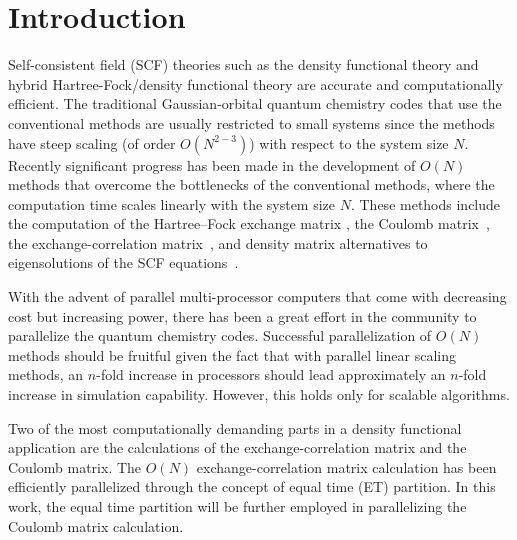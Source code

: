 \commentoutA{\documentclass[prl,aps,twocolumn,twocolumngrid,superbib]{revtex4}}
\begin{document}

\section{Introduction}
\label{sec:intro}
Self-consistent field (SCF) theories such as the density functional
theory and hybrid Hartree-Fock/density functional theory are accurate
and computationally efficient. The traditional Gaussian-orbital
quantum chemistry codes that use the conventional methods\cite{ASzabo}
are usually restricted to small systems since the methods have steep
scaling (of order $O(N^{2-3})$) with respect to the system size $N$.
Recently significant progress has been made in the development of
$O(N)$ methods that overcome the bottlenecks of the conventional
methods, where the computation time scales linearly with the system
size $N$.  These methods include the computation of the Hartree--Fock
exchange matrix
\cite{ESchwegler96,ESchwegler97,ESchwegler98A,ESchwegler99,ESchwegler00},
the Coulomb
matrix~\cite{CWhite94B,CWhite96A,MChallacombe96,MChallacombe96B,MStrain96,MChallacombe97},
the exchange-correlation
matrix~\cite{Jorda95,RStratmann96,CGuerra98,MChallacombe00A}, and
density matrix alternatives to eigensolutions of the SCF
equations~\cite{XLi93,MDaw93,SQiu94,Hernandez96,ADaniels97,APalser98,MChallacombe99,ANiklasson02A,ANiklasson03}.

With the advent of parallel multi-processor computers that come with
decreasing cost but increasing power, there has been a great effort in
the community to parallelize the quantum chemistry
codes\cite{Harrison_94v45,Guerra_95,Sosa_98v19,Stephan_98v108,Furlani_00v128,Sosa_00v26,Yoshihiro_01v346,Baker_02v23,HTakashima02}.
Successful parallelization of $O(N)$ methods should be fruitful given
the fact that with parallel linear scaling methods, an $n$-fold
increase in processors should lead approximately an $n$-fold increase
in simulation capability. However, this holds only for scalable
algorithms.

Two of the most computationally demanding parts in a density
functional application are the calculations of the
exchange-correlation matrix and the Coulomb matrix. The $O(N)$
exchange-correlation matrix calculation has been efficiently
parallelized through the concept of equal time (ET)
partition\cite{CGan03}.  In this work, the equal time partition will
be further employed in parallelizing the Coulomb matrix calculation.
\end{document}
